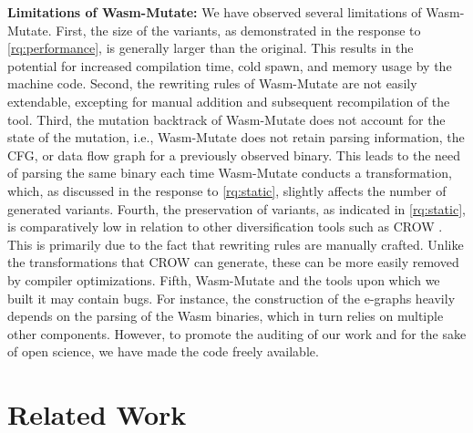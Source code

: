 \documentclass[a4paper,fleqn]{cas-dc}
\newcommand*\badge[1]{ \colorbox{red}{\color{white}#1}}
\newcommand{\tool}{{\sc Wasm-Mutate}\xspace}
\newenvironment{revision1}{\color{blue}}{}
\newcommand{\todo}[1]{%
\refstepcounter{todo}
\noindent\textbf{\badge{TODO}} {\color{red}#1}
\addcontentsline{td}{todo}
{\color{red}\thesection.\thetodo\xspace #1}}
\begin{document}
\begin{revision1}
    
    \textbf{Limitations of \tool:} We have observed several limitations of \tool.
    First, the size of the variants, as demonstrated in the response to \ref{rq:performance}, is generally larger than the original. 
    This results in the potential for increased compilation time, cold spawn, and memory usage by the machine code. 
    Second, the rewriting rules of \tool are not easily extendable, excepting for manual addition and subsequent recompilation of the tool. 
    Third, the mutation backtrack of \tool does not account for the state of the mutation, i.e., \tool does not retain parsing information, the CFG, or data flow graph for a previously observed binary. 
    This leads to the need of parsing the same binary each time \tool conducts a transformation, which, as discussed in the response to \ref{rq:static}, slightly affects the number of generated variants. 
    Fourth, the preservation of variants, as indicated in \ref{rq:static}, is comparatively low in relation to other diversification tools such as CROW \cite{arteaga2020crow}. 
    This is primarily due to the fact that rewriting rules are manually crafted. 
    Unlike the transformations that CROW can generate, these can be more easily removed by compiler optimizations.
    Fifth, \tool and the tools upon which we built it may contain bugs. 
    For instance, the construction of the e-graphs heavily depends on the parsing of the Wasm binaries, which in turn relies on multiple other components. 
    However, to promote the auditing of our work and for the sake of open science, we have made the code freely available.
    

    
\end{revision1}



\section{Related Work}
\label{rw}
\end{document}
